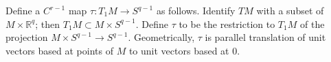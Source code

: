 Define a $C^{r-1}$ map $\tau: T_1 M \to S^{q-1}$ as follows. Identify $TM$ with a subset of $M \times \mathbb{R}^q$; then $T_1 M \subset M \times S^{q-1}$. Define $\tau$ to be the restriction to $T_1 M$ of the projection $M \times S^{q-1} \to S^{q-1}$. Geometrically, $\tau$ is parallel translation of unit vectors based at points of $M$ to unit vectors based at $0$.
